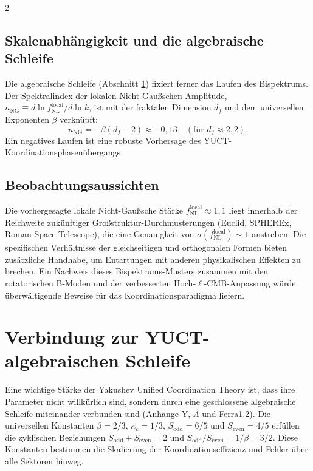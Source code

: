 \documentclass[11pt,a4paper]{article}
\begin{document}
\begin{multicols}{2}
		\subsection{Skalenabhängigkeit und die algebraische Schleife}
		Die algebraische Schleife (Abschnitt \ref{sec:algebraic}) fixiert ferner das Laufen des Bispektrums. Der Spektralindex der lokalen Nicht-Gaußschen Amplitude, $n_{\mathrm{NG}} \equiv d\ln f_{\mathrm{NL}}^{\mathrm{local}} / d\ln k$, ist mit der fraktalen Dimension $d_f$ und dem universellen Exponenten $\beta$ verknüpft:
		\begin{equation}
			n_{\mathrm{NG}} = -\beta (d_f - 2) \approx -0,13 \quad (\text{für } d_f \approx 2,2).
		\end{equation}
		Ein negatives Laufen ist eine robuste Vorhersage des YUCT-Koordinationsphasenübergangs.
		
		\subsection{Beobachtungsaussichten}
		Die vorhergesagte lokale Nicht-Gaußsche Stärke $f_{\mathrm{NL}}^{\mathrm{local}} \approx 1,1$ liegt innerhalb der Reichweite zukünftiger Großstruktur-Durchmusterungen (Euclid, SPHEREx, Roman Space Telescope), die eine Genauigkeit von $\sigma(f_{\mathrm{NL}}^{\mathrm{local}}) \sim 1$ anstreben. Die spezifischen Verhältnisse der gleichseitigen und orthogonalen Formen bieten zusätzliche Handhabe, um Entartungen mit anderen physikalischen Effekten zu brechen. Ein Nachweis dieses Bispektrums-Musters zusammen mit den rotatorischen B-Moden und der verbesserten Hoch-$\ell$-CMB-Anpassung würde überwältigende Beweise für das Koordinationsparadigma liefern.
		
		\section{Verbindung zur YUCT-algebraischen Schleife}
		\label{sec:algebraic}
		
		Eine wichtige Stärke der Yakushev Unified Coordination Theory ist, dass ihre Parameter nicht willkürlich sind, sondern durch eine geschlossene algebraische Schleife miteinander verbunden sind (Anhänge Y, $\Lambda$ und Ferra1.2). Die universellen Konstanten $\beta=2/3$, $\kappa_c=1/3$, $S_{\mathrm{odd}}=6/5$ und $S_{\mathrm{even}}=4/5$ erfüllen die zyklischen Beziehungen $S_{\mathrm{odd}}+S_{\mathrm{even}}=2$ und $S_{\mathrm{odd}}/S_{\mathrm{even}} = 1/\beta = 3/2$. Diese Konstanten bestimmen die Skalierung der Koordinationseffizienz und Fehler über alle Sektoren hinweg.
		

\end{multicols}
\end{document}
